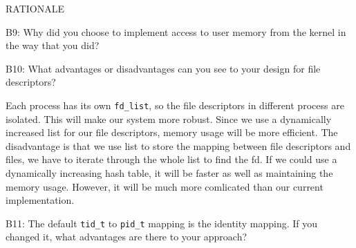 \begin{aspect}{RATIONALE}
	\begin{qc}
		B9: Why did you choose to implement access to user memory from the kernel in the way that you did?
	\end{qc}

	\begin{qc}
		B10: What advantages or disadvantages can you see to your design for file descriptors?
	\end{qc}
	Each process has its own \lstinline{fd_list}, so the file descriptors in different process are isolated. This will make our system more robust. Since we use a dynamically increased list for our file descriptors, memory usage will be more efficient. The disadvantage is that we use list to store the mapping between file descriptors and files, we have to iterate through the whole list to find the fd. If we could use a dynamically increasing hash table, it will be faster as well as maintaining the memory usage. However, it will be much more comlicated than our current implementation.

	\begin{qc}
		B11: The default \lstinline{tid_t} to \lstinline{pid_t} mapping is the identity mapping.
		If you changed it, what advantages are there to your approach?
	\end{qc}
\end{aspect}
